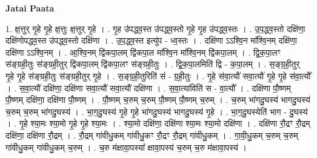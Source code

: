 \documentclass[17pt]{extarticle}
\begin{document}
\textbf{Jatai Paata} \newline

1. क्ष॒त्तुर् गृ॒हे गृ॒हे क्ष॒त्तुः क्ष॒त्तुर् गृ॒हे । . गृ॒ह उ॑पद्ध्व॒स्त उ॑पद्ध्व॒स्तो गृ॒हे गृ॒ह उ॑पद्ध्व॒स्तः । . उ॒प॒द्ध्व॒स्तो दक्षि॑णा॒ दक्षि॑णोपद्ध्व॒स्त उ॑पद्ध्व॒स्तो दक्षि॑णा । . उ॒प॒द्ध्व॒स्त इत्यु॑प - ध्व॒स्तः । . दक्षि॑णा ऽऽश्वि॒न मा᳚श्वि॒नम् दक्षि॑णा॒ दक्षि॑णा ऽऽश्वि॒नम् । . आ॒श्वि॒नम् द्वि॑कपा॒लम् द्वि॑कपा॒ल मा᳚श्वि॒न मा᳚श्वि॒नम् द्वि॑कपा॒लम् । . द्वि॒क॒पा॒लꣳ स॑ङ्ग्रही॒तुः स॑ङ्ग्रही॒तुर् द्वि॑कपा॒लम् द्वि॑कपा॒लꣳ स॑ङ्ग्रही॒तुः । . द्वि॒क॒पा॒लमिति॑ द्वि - क॒पा॒लम् । . स॒ङ्ग्र॒ही॒तुर् गृ॒हे गृ॒हे स॑ङ्ग्रही॒तुः स॑ङ्ग्रही॒तुर् गृ॒हे । . स॒ङ्ग्र॒ही॒तुरिति॑ सं - ग्र॒ही॒तुः । . गृ॒हे स॑वा॒त्यौ॑ सवा॒त्यौ॑ गृ॒हे गृ॒हे स॑वा॒त्यौ᳚ । . स॒वा॒त्यौ॑ दक्षि॑णा॒ दक्षि॑णा सवा॒त्यौ॑ सवा॒त्यौ॑ दक्षि॑णा । . स॒वा॒त्या॑विति॑ स - वा॒त्यौ᳚ । . दक्षि॑णा पौ॒ष्णम् पौ॒ष्णम् दक्षि॑णा॒ दक्षि॑णा पौ॒ष्णम् । . पौ॒ष्णम् च॒रुम् च॒रुम् पौ॒ष्णम् पौ॒ष्णम् च॒रुम् । . च॒रुम् भा॑गदु॒घस्य॑ भागदु॒घस्य॑ च॒रुम् च॒रुम् भा॑गदु॒घस्य॑ । . भा॒ग॒दु॒घस्य॑ गृ॒हे गृ॒हे भा॑गदु॒घस्य॑ भागदु॒घस्य॑ गृ॒हे । . भा॒ग॒दु॒घस्येति॑ भाग - दु॒घस्य॑ । . गृ॒हे श्या॒मः श्या॒मो गृ॒हे गृ॒हे श्या॒मः । . श्या॒मो दक्षि॑णा॒ दक्षि॑णा श्या॒मः श्या॒मो दक्षि॑णा । . दक्षि॑णा रौ॒द्रꣳ रौ॒द्रम् दक्षि॑णा॒ दक्षि॑णा रौ॒द्रम् । . रौ॒द्रम् गा॑वीधु॒कम् गा॑वीधु॒कꣳ रौ॒द्रꣳ रौ॒द्रम् गा॑वीधु॒कम् । . गा॒वी॒धु॒कम् च॒रुम् च॒रुम् गा॑वीधु॒कम् गा॑वीधु॒कम् च॒रुम् । . च॒रु म॑क्षावा॒पस्या᳚ क्षावा॒पस्य॑ च॒रुम् च॒रु म॑क्षावा॒पस्य॑ । \newline
\end{document}
